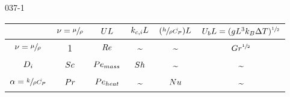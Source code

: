 \begin{mitframe}{037-1}



\begin{longtable}{ | c | c | c | c | c | c | } 
 \hline
    & $\freq = \sfrac{\chempot}{\dens}$
    & $\uvel\length$ 
    & $\masstranscoeff\length$ 
    & $(\sfrac{\planck}{\dens\hat{\cp}})\length$
    & $\uvel_{b}\length = (\grav\length^{3}\boltz\iipf\Temp)^{\sfrac{1}{2}}$
    \\
    \hline
    $\freq = \sfrac{\chempot}{\dens}$ & 1 & $\reynolds$ & \textasciitilde & \textasciitilde & $\grashof^{\sfrac{1}{2}}$ \\ \hline
    $\pdiff$ & $\schmidt$ & $\peclet_{mass}$ & $\sherwood$ & \textasciitilde & \textasciitilde \\ \hline    
    $\tdiff = \sfrac{\thermcond}{\dens\hat{\cp}}$ & $\prandtl$ & $\peclet_{heat}$ & \textasciitilde & $\nusselt$ & \textasciitilde \\ \hline   
 
\end{longtable}

\end{mitframe}